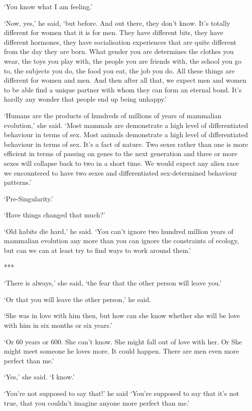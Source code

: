 `You know what I am feeling.'

`Now, yes,' he said, `but before. And out there, they don't know. It's totally
different for women that it is for men. They have different bits,
they have different hormones, they have socialisation experiences
that are quite different from the day they are born. What gender you
are determines the clothes you wear, the toys you play with, the
people you are friends with, the school you go to, the subjects you
do, the food you eat, the job you do. All these things are different
for women and men. And then after all that, we expect men and women
to be able find a unique partner with whom they can form an eternal
bond. It's hardly any wonder that people end up being unhappy.'

`Humans are the products of hundreds of millions of years of
mammalian evolution,' she said. `Most mammals are demonstrate a high level of differentiated behaviour in terms of sex. Most {\twelveit animals\/} demonstrate a high level of differentiated behaviour in terms of sex.
It's a fact
of nature. Two sexes rather than one is more efficient in terms
of passing on genes to the next generation and three or more sexes
will collapse back to two in a short time. We would
expect any alien race we encountered to have two sexes and
differentiated sex-determined behaviour patterns.'

`Pre-Singularity.'

`Have things changed that much?'

`Old habits die hard,' he said. `You can't ignore two hundred million years of
mammalian evolution any more than you can ignore the constraints of
ecology, but can we can at least try to find ways to work around
them.'

***

`There is always,' she said, `the fear that the other person will leave you.'

`Or that you will leave the other person,' he said.

`She was in love with him then, but how can she know whether
she will be love with him in six months or six years.'

`Or 60 years or 600. She can't know. She might fall out of love with
her. Or She might meet someone he loves more. It could happen.
There are men even more perfect than me.'

`Yes,' she said. `I know.'

`You're not supposed to say that!' he said `You're supposed to say that it's
not true, that you couldn't imagine anyone more perfect than me.'

